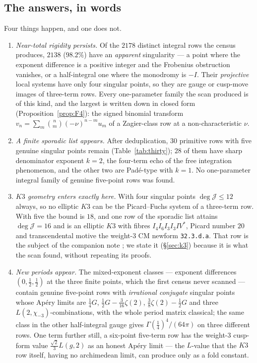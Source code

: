\documentclass[11pt,reqno]{amsart}
\theoremstyle{plain}
\theoremstyle{definition}
\theoremstyle{remark}
\theoremstyle{plain}
\newcommand{\Jm}{\mathcal J}
\begin{document}
\subsection{The answers, in words}
Four things happen, and one does not.

\begin{enumerate}[label=\textup{(\arabic*)},leftmargin=2.4em]
\item \emph{Near-total rigidity persists.} Of the $2178$ distinct integral rows
the census produces, $2138$ ($98.2\%$) have an \emph{apparent} singularity --- a
point where the exponent difference is a positive integer and the Frobenius
obstruction vanishes, or a half-integral one where the monodromy is $-I$. Their
\emph{projective} local systems have only four singular points, so they are gauge
or cusp-move images of three-term rows. Every one-parameter family the scan
produced is of this kind, and the largest is written down in closed form
(Proposition~\ref{prop:F4}): the signed binomial transform
$v_n=\sum_m\binom nm(-\nu)^{n-m}u_m$ of a Zagier-class row at a
non-characteristic $\nu$.

\item \emph{A finite sporadic list appears.} After deduplication, $30$ primitive
rows with five genuine singular points remain (Table~\ref{tab:thirty}); $28$ of
them have sharp denominator exponent $k=2$, the four-term echo of the free
integration phenomenon, and the other two are Pad\'e-type with $k=1$. No
one-parameter integral family of genuine five-point rows was found.

\item \emph{$K3$ geometry enters exactly here.} With four singular points
$\deg\Jm\le12$ always, so no elliptic $K3$ can be the Picard--Fuchs system of a
three-term row. With five the bound is $18$, and one row of the sporadic list
attains $\deg\Jm=16$ and is an elliptic $K3$ with fibres $I_4I_6I_3I_3IV^*$,
Picard number $20$ and transcendental motive the weight-$3$ CM newform
\texttt{32.3.d.a}. That row is the subject of the companion note \cite{K3PAPER};
we state it (\S\ref{sec:k3}) because it is what the scan found, without repeating
its proofs.

\item \emph{New periods appear.} The mixed-exponent classes --- exponent
differences $(0,\tfrac12,\tfrac12)$ at the three finite points, which the first
census never scanned --- contain genuine five-point rows with \emph{irrational
conjugate} singular points whose Ap\'ery limits are $\tfrac14G$,
$\tfrac12G-\tfrac3{16}\zeta(2)$, $\tfrac38\zeta(2)-\tfrac12G$ and three
$L(2,\chi_{-3})$-combinations, with the whole period matrix classical; the same
class in the other half-integral gauge gives $\Gamma(\tfrac14)^4/(64\pi)$ on
three different rows. One term further still, a six-point five-term row has the
weight-$3$ cusp-form value $\tfrac{\sqrt2}3L(g,2)$ as an honest Ap\'ery limit ---
the $L$-value that the $K3$ row itself, having no archimedean limit, can produce
only as a fold constant.
\end{enumerate}
\end{document}
